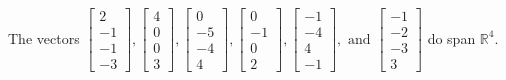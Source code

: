 \begin{exercise}
\begin{exerciseStatement}
  \end{exerciseStatement}
  \begin{exerciseAnswer}
   The vectors \(\left[\begin{array}{r}
2 \\
-1 \\
-1 \\
-3
\end{array}\right] , \left[\begin{array}{r}
4 \\
0 \\
0 \\
3
\end{array}\right] , \left[\begin{array}{r}
0 \\
-5 \\
-4 \\
4
\end{array}\right] , \left[\begin{array}{r}
0 \\
-1 \\
0 \\
2
\end{array}\right] , \left[\begin{array}{r}
-1 \\
-4 \\
4 \\
-1
\end{array}\right] , \text{ and } \left[\begin{array}{r}
-1 \\
-2 \\
-3 \\
3
\end{array}\right]\) 
  	 do  
	span \(\mathbb{R}^4\).
  


  \end{exerciseAnswer}
\end{exercise}